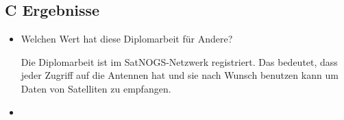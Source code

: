 \subsection*{C Ergebnisse}
\begin{itemize}
	\item Welchen Wert hat diese Diplomarbeit für Andere?
	
	Die Diplomarbeit ist im SatNOGS-Netzwerk registriert. Das bedeutet, dass jeder Zugriff auf die Antennen hat und sie nach Wunsch benutzen kann um Daten von Satelliten zu empfangen.
	
	\item 
\end{itemize}